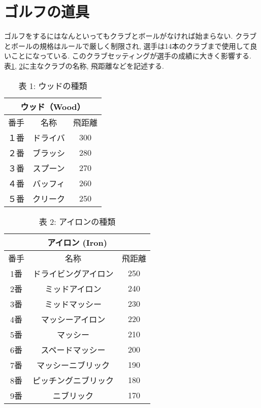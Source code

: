 \documentclass[a4j, twocolumn]{jarticle}
\begin{document}
\section{ゴルフの道具}
ゴルフをするにはなんといってもクラブとボールがなければ始まらない. クラブとボールの規格はルールで厳しく制限され, 選手は14本のクラブまで使用して良いことになっている\cite{GOLFRULE}. このクラブセッティングが選手の成績に大きく影響する. 表\ref{wood-data}, \ref{iron-data}に主なクラブの名称, 飛距離などを記述する.
\begin{table}[htb]
  \caption{表 1: ウッドの種類}\label{wood-data}
  \begin{center}
    \begin{tabular}{|c|c|c|}
      \hline
      \multicolumn{3}{|c|}{ウッド（Wood）} \\
      \hline
      \hline
      番手 & 名称 & 飛距離 \\
      \hline
      １番 & ドライバ & 300 \\
      \hline
      ２番 & ブラッシ & 280 \\
      \hline
      ３番 & スプーン & 270 \\
      \hline
      ４番 & バッフィ & 260\\
      \hline 
      ５番 & クリーク & 250 \\
      \hline
      
    \end{tabular}
  \end{center}
\end{table}
\vspace{-3em}
\begin{table}[htb]
  \caption{表 2: アイロンの種類}\label{iron-data}
  \begin{center}
    \begin{tabular}{|c|c|c|}
      \hline
      \multicolumn{3}{|c|}{アイロン (Iron)} \\
      \hline
      \hline
      番手 & 名称 & 飛距離 \\
      \hline
      1番 & ドライビングアイロン & 250 \\
      \hline
      2番 & ミッドアイロン & 240 \\
      \hline
      3番 & ミッドマッシー & 230 \\
      \hline
      4番 & マッシーアイロン & 220\\
      \hline 
      5番 & マッシー & 210 \\
      \hline
      6番 & スペードマッシー & 200 \\
      \hline
      7番 & マッシーニブリック & 190\\
      \hline 
      8番 & ピッチングニブリック & 180 \\
      \hline
      9番 & ニブリック & 170 \\
      \hline
    \end{tabular}
  \end{center}
\end{table}
\vspace{-2em}
\end{document}
